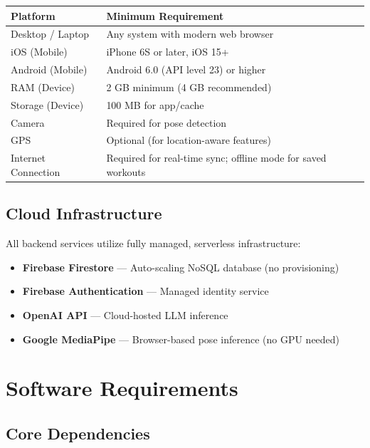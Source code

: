 \documentclass[12pt,a4paper]{article}
\begin{document}
\begin{longtable}{p{4.5cm} p{8cm}}
\toprule
\textbf{Platform} & \textbf{Minimum Requirement} \\
\midrule
\endhead
Desktop / Laptop & Any system with modern web browser \\
iOS (Mobile) & iPhone 6S or later, iOS 15+ \\
Android (Mobile) & Android 6.0 (API level 23) or higher \\
RAM (Device) & 2 GB minimum (4 GB recommended) \\
Storage (Device) & 100 MB for app/cache \\
Camera & Required for pose detection \\
GPS & Optional (for location-aware features) \\
Internet Connection & Required for real-time sync; offline mode for saved workouts \\
\bottomrule
\end{longtable}

\subsection{Cloud Infrastructure}

All backend services utilize fully managed, serverless infrastructure:

\begin{itemize}[noitemsep, topsep=2pt]
  \item \textbf{Firebase Firestore} --- Auto-scaling NoSQL database (no provisioning)
  \item \textbf{Firebase Authentication} --- Managed identity service
  \item \textbf{OpenAI API} --- Cloud-hosted LLM inference
  \item \textbf{Google MediaPipe} --- Browser-based pose inference (no GPU needed)
\end{itemize}

\section{Software Requirements}

\subsection{Core Dependencies}
\end{document}
